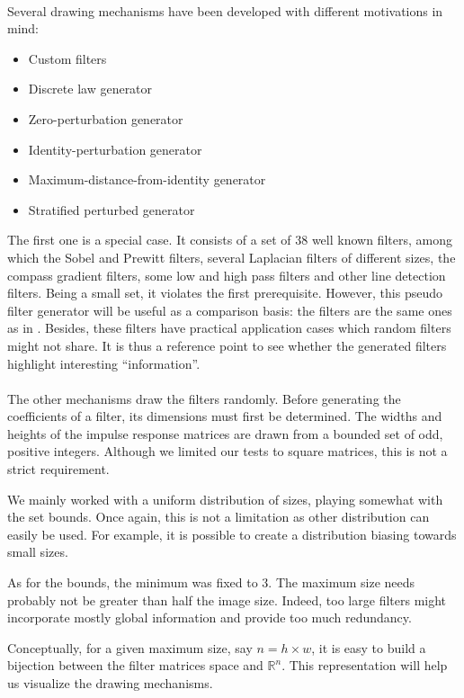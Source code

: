 \documentclass[a4paper]{report}
\newlength{\larg}
\begin{document}
			\paragraph{}
			Several drawing mechanisms have been developed with different motivations in mind:
			
			\begin{itemize}
				\item Custom filters
				\item Discrete law generator
				\item Zero-perturbation generator
				\item Identity-perturbation generator
				\item Maximum-distance-from-identity generator
				\item Stratified perturbed generator
			\end{itemize}
			
			The first one is a special case. It consists of a set of 38 well known filters, among which the Sobel and Prewitt filters, several Laplacian filters of different sizes, the compass gradient filters, some low and high pass filters and other line detection filters.
			Being a small set, it violates the first prerequisite. However, this pseudo filter generator will be useful as a comparison basis: the filters are the same ones as in \cite{base}. Besides, these filters have practical application cases which random filters might not share. It is thus a reference point to see whether the generated filters highlight interesting ``information''.
			\paragraph{}
			The other mechanisms draw the filters randomly. Before generating the coefficients of a filter, its dimensions must first be determined. The widths and heights of the impulse response matrices are drawn from a bounded set of odd, positive integers. Although we limited our tests to square matrices, this is not a strict requirement.
			\par
			We mainly worked with a uniform distribution of sizes, playing somewhat with the set bounds. Once again, this is not a limitation as other distribution can easily be used. For example, it is possible to create a distribution biasing towards small sizes. 
			\par
			As for the bounds, the minimum was fixed to 3. The maximum size needs probably not be greater than half the image size. Indeed, too large filters might incorporate mostly global information and provide too much redundancy.
			\par
			Conceptually, for a given maximum size, say $n = h \times w$, it is easy to build a bijection between the filter matrices space and $\mathbb{R}^n$. This representation will help us visualize the drawing mechanisms.
			
\end{document}

